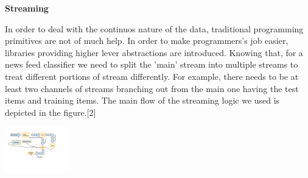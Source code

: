 \begin{center} \textbf{\huge Streaming} \end{center}
In order to deal with the continuos nature of the data, traditional programming primitives are not of much help. In order to make programmers's job easier, libraries providing higher lever abstractions are introduced. Knowing that, for a news feed classifier we need to split the 'main' stream into multiple streams to treat different portions of stream differently. For example, there needs to be at least two channels of streams branching out from the main one having the test items and training items. The main flow of the streaming logic we used is depicted in the figure.[2]\\
\begin{center}
\includegraphics[width=0.2\textwidth]{./time_models/streaming_diagram}
\end{center}
